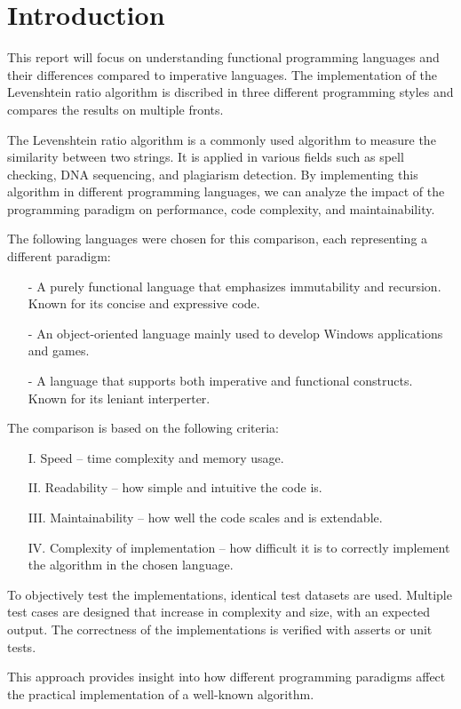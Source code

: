 \section{Introduction}
\label{sec:introduction}
This report will focus on understanding functional programming
languages and their differences compared to imperative languages.
The implementation of the Levenshtein ratio algorithm is discribed in three
different programming styles and compares the results on multiple fronts.

The Levenshtein ratio algorithm is a commonly used
algorithm to measure the similarity between two strings.
It is applied in various fields such as spell checking, DNA sequencing, and plagiarism detection.
By implementing this algorithm in different programming languages, we can analyze the impact of
the programming paradigm on performance, code complexity, and maintainability.

The following languages were chosen for this comparison, each representing a different paradigm:
\begin{itemize}
  \item[-]  A purely functional language that
  emphasizes immutability and recursion. Known for its concise and expressive code.
  \item[-]  An object-oriented language mainly
  used to develop Windows applications and games.
  \item[-]  A language that supports both imperative
  and functional constructs. Known for its leniant interperter.
\end{itemize}

The comparison is based on the following criteria:
\begin{enumerate}
  \item[I.] Speed – time complexity and memory usage.
  \item[II.] Readability – how simple and intuitive the code is.
  \item[III.] Maintainability – how well the code scales and is extendable.
  \item[IV.] Complexity of implementation – how difficult it is to correctly implement the algorithm in the chosen language.
\end{enumerate}

To objectively test the implementations, identical test datasets are used. Multiple test cases are designed that increase in complexity and size, with an expected output. The correctness of the implementations is verified with asserts or unit tests.

This approach provides insight into how different programming paradigms affect the practical implementation of a well-known algorithm.
